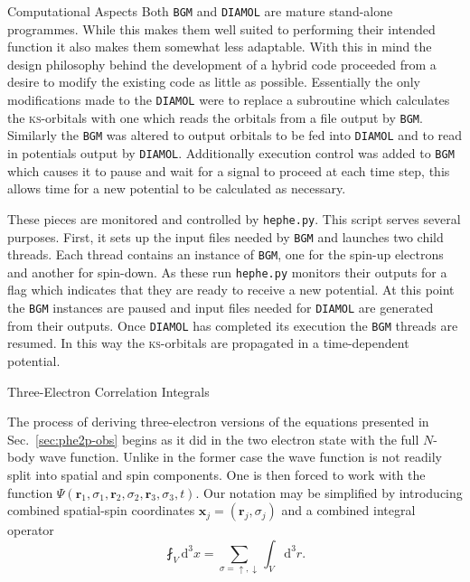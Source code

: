 \documentclass[letterpaper, 11 pt]{report}
\begin{document}
\begin{appendices}
\begin{chapter}{Computational Aspects \label{chap:calcdeets}}
      Both \texttt{BGM} and \texttt{DIAMOL} are mature stand-alone programmes. While this makes them
      well suited to performing their intended function it also makes them somewhat less adaptable. With
      this in mind the design philosophy behind the development of a hybrid code proceeded from a desire
      to modify the existing code as little as possible. Essentially the only modifications made to the
      \texttt{DIAMOL} were to replace a subroutine which calculates the \textsc{ks}-orbitals with one
      which reads the orbitals from a file output by \texttt{BGM}. Similarly the \texttt{BGM} was
      altered to output orbitals to be fed into \texttt{DIAMOL} and to read in potentials output by
      \texttt{DIAMOL}. Additionally execution control was added to \texttt{BGM} which causes it to pause
      and wait for a signal to proceed at each time step, this allows time for a new potential to be
      calculated as necessary.

      These pieces are monitored and controlled by \texttt{hephe.py}. This script serves several
      purposes. First, it sets up the input files needed by \texttt{BGM} and launches two child threads.
      Each thread contains an instance of \texttt{BGM}, one for the spin-up electrons and another for
      spin-down. As these run \texttt{hephe.py} monitors their outputs for a flag which indicates that
      they are ready to receive a new potential. At this point the \texttt{BGM} instances are paused
      and input files needed for \texttt{DIAMOL} are generated from their outputs. Once \texttt{DIAMOL}
      has completed its execution the \texttt{BGM} threads are resumed. In this way the
      \textsc{ks}-orbitals are propagated in a time-dependent potential.

   \end{chapter}

   \begin{chapter}{Three-Electron Correlation Integrals \label{chap:moreIc}}

      The process of deriving three-electron versions of the equations presented in
      Sec.~\ref{sec:phe2p-obs} begins as it did in the two electron state with the full $N$-body wave
      function. Unlike in the former case the wave function is not readily split into spatial and spin
      components. One is then forced to work with the function $\Psi(\mathbf{r}_1, \sigma_1,
      \mathbf{r}_2, \sigma_2, \mathbf{r}_3, \sigma_3, t)$. Our notation may be simplified by
      introducing combined spatial-spin coordinates $\mathbf{x}_j = (\mathbf{r}_j, \sigma_j)$ and a
      combined integral operator
      \begin{equation} \label{eq:combInt}
         \fint_V \mathrm{d}^3x = \sum\limits_{\sigma = \uparrow, \downarrow} \int_V \mathrm{d}^3 r.
      \end{equation}



\end{chapter}
\end{appendices}
\end{document}
